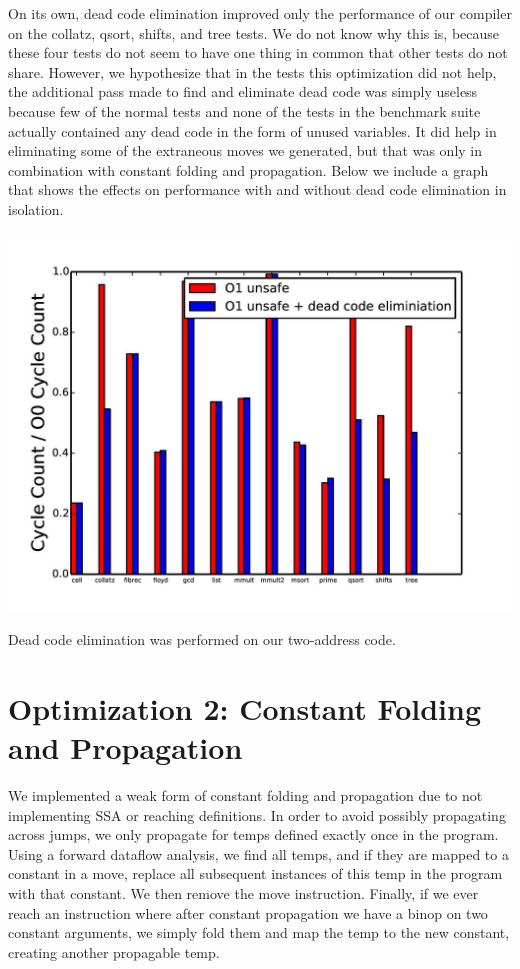 \documentclass{article}
\begin{document}
On its own, dead code elimination improved only the performance of our compiler on the collatz, qsort, shifts, and tree tests. We do not know why this is, because these four tests do not seem to have one thing in common that other tests do not share. However, we hypothesize that in the tests this optimization did not help, the additional pass made to find and eliminate dead code was simply useless because few of the normal tests and none of the tests in the benchmark suite actually contained any dead code in the form of unused variables. It did help in eliminating some of the extraneous moves we generated, but that was only in combination with constant folding and propagation. Below we include a graph that shows the effects on performance with and without dead code elimination in isolation.

\includegraphics[scale=0.5]{O1_vs_deadcode-page-001}

Dead code elimination was performed on our two-address code.

\section{Optimization 2: Constant Folding and Propagation}

We implemented a weak form of constant folding and propagation due to not implementing SSA or reaching definitions. In order to avoid possibly propagating across jumps, we only propagate for temps defined exactly once in the program. Using a forward dataflow analysis, we find all temps, and if they are mapped to a constant in a move, replace all subsequent instances of this temp in the program with that constant. We then remove the move instruction. Finally, if we ever reach an instruction where after constant propagation we have a binop on two constant arguments, we simply fold them and map the temp to the new constant, creating another propagable temp.
\end{document}
